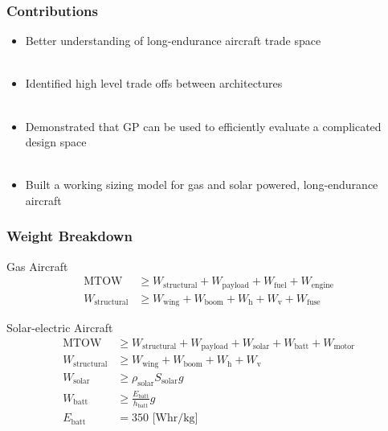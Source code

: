 \documentclass{beamer}
\begin{document}
\begin{frame}
    \frametitle{Contributions}

    \begin{itemize}
        \pause
        \item Better understanding of long-endurance aircraft trade space \\~\\
        \pause
        \item Identified high level trade offs between architectures \\~\\
        \pause
        \item Demonstrated that GP can be used to efficiently evaluate a complicated design space \\~\\
            \pause
        \item Built a working sizing model for gas and solar powered, long-endurance aircraft
        \end{itemize}

\end{frame}


\begin{frame}
    \frametitle{Weight Breakdown}

    \pause
    Gas Aircraft
    \begin{align*}
        \text{MTOW} &\geq W_{\text{structural}}  + W_{\text{payload}} + W_{\text{fuel}} + W_{\text{engine}} \\
        W_{\text{structural}} &\geq W_{\text{wing}} + W_{\text{boom}} + W_{\text{h}}+ W_{\text{v}} + W_{\text{fuse}}
    \end{align*}

    \pause
    Solar-electric Aircraft
    \begin{align*}
        \text{MTOW} &\geq W_{\text{structural}} + W_{\text{payload}} + W_{\text{solar}} + W_{\text{batt}} + W_{\text{motor}} \\
        W_{\text{structural}} &\geq W_{\text{wing}} + W_{\text{boom}} + W_{\text{h}}+ W_{\text{v}} \\
        W_{\text{solar}} &\geq \rho_{\text{solar}} S_{\text{solar}} g \\
        W_{\text{batt}} &\geq \frac{E_{\text{batt}}}{h_{\text{batt}}} g \\
        E_{\text{batt}} &= 350 \text{ [Whr/kg]}
    \end{align*}

\end{frame}
\end{document}

